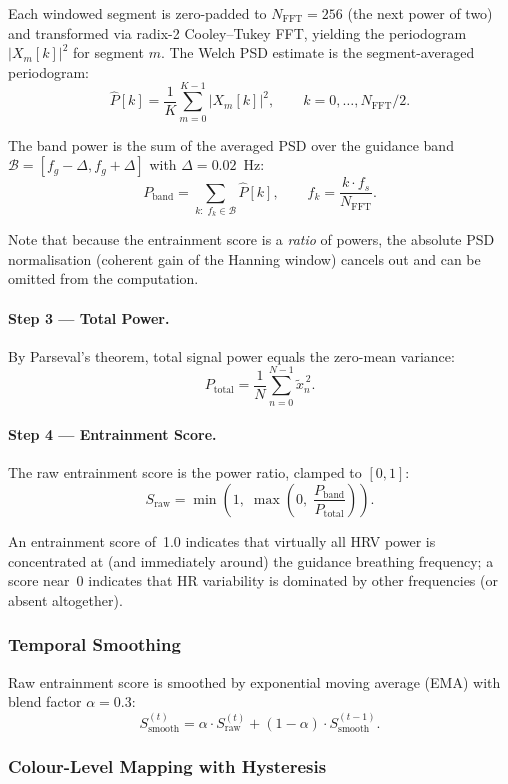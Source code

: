 \documentclass[11pt,a4paper]{article}
\begin{document}
Each windowed segment is zero-padded to $N_{\text{FFT}} = 256$ (the next power
of two) and transformed via radix-2 Cooley--Tukey FFT, yielding the periodogram
$|X_m[k]|^2$ for segment $m$. The Welch PSD estimate is the segment-averaged
periodogram:
\[
\hat{P}[k] = \frac{1}{K} \sum_{m=0}^{K-1} |X_m[k]|^2, \qquad
k = 0, \dots, N_{\text{FFT}}/2.
\]

The band power is the sum of the averaged PSD over the guidance band
$\mathcal{B} = [f_g - \Delta, f_g + \Delta]$ with $\Delta = 0.02$~Hz:
\[
P_{\text{band}} = \sum_{k:\; f_k \in \mathcal{B}} \hat{P}[k], \qquad
f_k = \frac{k \cdot f_s}{N_{\text{FFT}}}.
\]

Note that because the entrainment score is a \textit{ratio} of powers, the
absolute PSD normalisation (coherent gain of the Hanning window) cancels out
and can be omitted from the computation.

\paragraph{Step 3 — Total Power.}
By Parseval's theorem, total signal power equals the zero-mean variance:
\[
P_{\text{total}} = \frac{1}{N} \sum_{n=0}^{N-1} \tilde{x}_n^{\,2}.
\]

\paragraph{Step 4 — Entrainment Score.}
The raw entrainment score is the power ratio, clamped to $[0, 1]$:
\[
S_{\text{raw}} = \min\!\left(1,\; \max\!\left(0,\; \frac{P_{\text{band}}}{P_{\text{total}}}\right)\right).
\]

An entrainment score of~1.0 indicates that virtually all HRV power is
concentrated at (and immediately around) the guidance breathing frequency;
a score near~0 indicates that HR variability is dominated by other
frequencies (or absent altogether).

\subsubsection{Temporal Smoothing}

Raw entrainment score is smoothed by exponential moving average (EMA) with
blend factor $\alpha = 0.3$:
\[
S_{\text{smooth}}^{(t)} = \alpha \cdot S_{\text{raw}}^{(t)}
                         + (1 - \alpha) \cdot S_{\text{smooth}}^{(t-1)}.
\]

\subsubsection{Colour-Level Mapping with Hysteresis}
\end{document}

